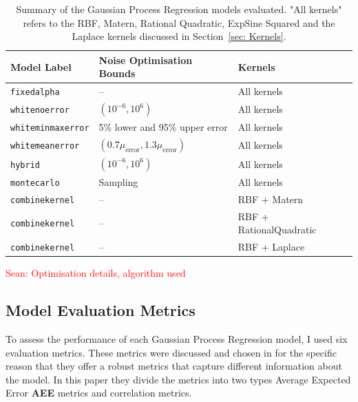 \documentclass[12pt]{article}
\newcommand{\Sean}[1]{{\textcolor{red}{{Sean: #1}} }}
\begin{document}
\begin{table}[h!]
    \renewcommand{\arraystretch}{1.3}
    \centering
    {\fontsize{7}{9.5}\selectfont
    \begin{tabular}{|l|l|l|}
    \hline
    \textbf{Model Label} & \textbf{Noise Optimisation Bounds} & \textbf{Kernels} \\
    \hline
    \texttt{fixedalpha} & -- & All kernels \\
    \hline
    \texttt{whitenoerror} & \((10^{-6}, 10^6)\) & All kernels \\
    \texttt{whiteminmaxerror} & 5\% lower and 95\% upper error & All kernels \\
    \texttt{whitemeanerror} & \((0.7\mu_{\text{error}}, 1.3\mu_{\text{error}})\) & All kernels \\
    \hline
    \texttt{hybrid} & \((10^{-6}, 10^6)\) & All kernels \\
    \hline
    \texttt{montecarlo} & Sampling & All kernels \\
    \hline
    \texttt{combinekernel} & -- & RBF + Matern \\
    \texttt{combinekernel} & -- & RBF + RationalQuadratic \\
    \texttt{combinekernel} & -- & RBF + Laplace \\
    \hline
    \end{tabular}}
    \caption{Summary of the Gaussian Process Regression models evaluated.
     "All kernels" refers to the RBF, Matern, Rational Quadratic, ExpSine Squared and the Laplace kernels discussed in Section~\ref{sec: Kernels}.}
    \label{tab:model_summary}
\end{table}


\Sean{Optimisation details, algorithm used}

\subsection{Model Evaluation Metrics}
\label{sec:metrics}

To assess the performance of each Gaussian Process Regression model, I used six evaluation metrics. These metrics were discussed and chosen in \cite{metrics} for the specific reason that they offer a robust metrics that capture different information about the model. In this paper they divide the metrics into two types Average Expected Error \textbf{AEE} metrics and correlation metrics. 
\end{document}
